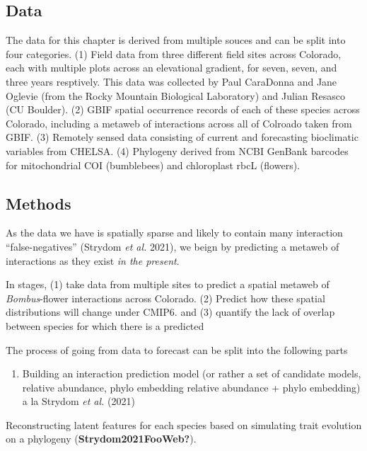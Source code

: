 \documentclass[10pt,oneside]{article}
\begin{document}
\hypertarget{data}{%
\subsection{Data}\label{data}}

The data for this chapter is derived from multiple souces and can be
split into four categories. (1) Field data from three different field
sites across Colorado, each with multiple plots across an elevational
gradient, for seven, seven, and three years resptively. This data was
collected by Paul CaraDonna and Jane Oglevie (from the Rocky Mountain
Biological Laboratory) and Julian Resasco (CU Boulder). (2) GBIF spatial
occurrence records of each of these species across Colorado, including a
metaweb of interactions across all of Colroado taken from GBIF. (3)
Remotely sensed data consisting of current and forecasting bioclimatic
variables from CHELSA. (4) Phylogeny derived from NCBI GenBank barcodes
for mitochondrial COI (bumblebees) and chloroplast rbcL (flowers).

\hypertarget{methods}{%
\subsection{Methods}\label{methods}}

As the data we have is spatially sparse and likely to contain many
interaction ``false-negatives'' (Strydom \emph{et al.} 2021), we beign
by predicting a metaweb of interactions as they exist \emph{in the
present}.

In stages, (1) take data from multiple sites to predict a spatial
metaweb of \emph{Bombus}-flower interactions across Colorado. (2)
Predict how these spatial distributions will change under CMIP6. and (3)
quantify the lack of overlap between species for which there is a
predicted

The process of going from data to forecast can be split into the
following parts

\begin{enumerate}
\def\labelenumi{\arabic{enumi})}
\tightlist
\item
  Building an interaction prediction model (or rather a set of candidate
  models, relative abundance, phylo embedding relative abundance + phylo
  embedding) a la Strydom \emph{et al.} (2021)
\end{enumerate}

Reconstructing latent features for each species based on simulating
trait evolution on a phylogeny (\textbf{Strydom2021FooWeb?}).
\end{document}
